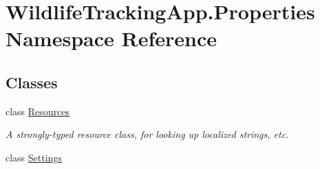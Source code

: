 \hypertarget{namespaceWildlifeTrackingApp_1_1Properties}{}\section{Wildlife\+Tracking\+App.\+Properties Namespace Reference}
\label{namespaceWildlifeTrackingApp_1_1Properties}
\subsection*{Classes}
\begin{DoxyCompactItemize}
\item 
class \hyperlink{classWildlifeTrackingApp_1_1Properties_1_1Resources}{Resources}
\begin{DoxyCompactList}\small\item\em A strongly-\/typed resource class, for looking up localized strings, etc. \end{DoxyCompactList}\item 
class \hyperlink{classWildlifeTrackingApp_1_1Properties_1_1Settings}{Settings}
\end{DoxyCompactItemize}
